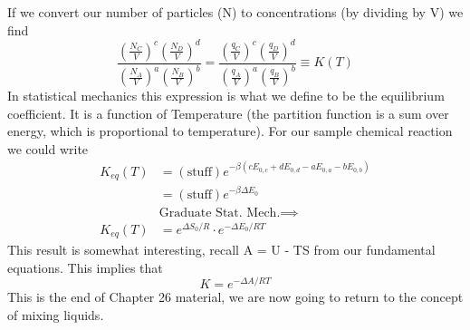 \documentclass{article}
\begin{document}
If we convert our number of particles (N) to concentrations (by dividing by V) we find
\begin{equation}
    \frac{\left(\frac{N_C}{V}\right)^c \left(\frac{N_D}{V}\right)^d}{
    \left(\frac{N_A}{V}\right)^a \left(\frac{N_B}{V}\right)^b} = \frac{\left(\frac{q_C}{V}\right)^c \left(\frac{q_D}{V}\right)^d}{\left(\frac{q_A}{V}\right)^a \left(\frac{q_B}{V}\right)^b} \equiv K(T)
\end{equation}
In statistical mechanics this expression is what we define to be the equilibrium coefficient. 
It is a function of Temperature (the partition function is a sum over energy, which is proportional to temperature). 
For our sample chemical reaction we could write
\begin{equation}
    \begin{split}
        K_{eq}(T) &= (\text{stuff})e^{-\beta(cE_{0,c} + dE_{0,d} - aE_{0,a} - bE_{0,b})}\\
        &= (\text{stuff}) e^{-\beta \Delta E_0}\\
        &\text{Graduate Stat. Mech.} \implies\\
        K_{eq}(T) &= e^{\Delta S_0 / R} \cdot e^{-\Delta E_0/RT}
    \end{split}
\end{equation}
 This result is somewhat interesting, recall A = U - TS from our fundamental equations. 
 This implies that 
 \begin{equation}
     K = e^{-\Delta A/RT}
 \end{equation}
 This is the end of Chapter 26 material, we are now going to return to the concept of mixing liquids. 
 
\end{document}
